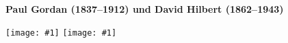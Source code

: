 \documentclass[a4paper,ngerman,landscape]{scrartcl}
\newcommand{\comic}[2]{%
  \texttt{[image: \#1]}}
\begin{document}
\begin{center}
  {\bf\sffamily\Huge Paul Gordan (1837--1912) und David Hilbert (1862--1943)}
  \vspace{4em}

  \phantom{a}
  \hfill
  \comic{Paul_Albert_Gordan}{1.0}
  \hfill
  \comic{Hilbert}{1.0}
  \hfill
  \phantom{a}
\end{center}
\end{document}
